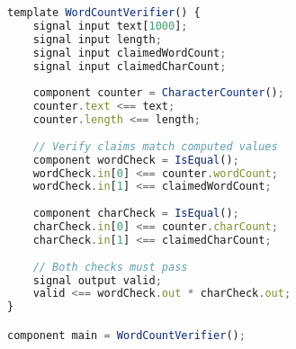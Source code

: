 \begin{lstlisting}[language=JavaScript,caption={circuits/wordcount.circom - ZK circuit for word count verification}]
template WordCountVerifier() {
    signal input text[1000];
    signal input length;
    signal input claimedWordCount;
    signal input claimedCharCount;
    
    component counter = CharacterCounter();
    counter.text <== text;
    counter.length <== length;
    
    // Verify claims match computed values
    component wordCheck = IsEqual();
    wordCheck.in[0] <== counter.wordCount;
    wordCheck.in[1] <== claimedWordCount;
    
    component charCheck = IsEqual();
    charCheck.in[0] <== counter.charCount;
    charCheck.in[1] <== claimedCharCount;
    
    // Both checks must pass
    signal output valid;
    valid <== wordCheck.out * charCheck.out;
}

component main = WordCountVerifier();
\end{lstlisting}
